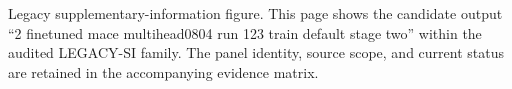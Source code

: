 Legacy supplementary-information figure. This page shows the candidate output ``2 finetuned mace multihead0804 run 123 train default stage two'' within the audited LEGACY-SI family. The panel identity, source scope, and current status are retained in the accompanying evidence matrix.
